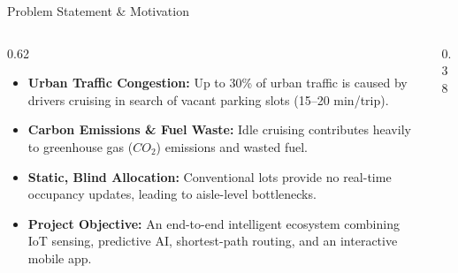 \documentclass[aspectratio=169]{beamer}
\begin{document}
\begin{frame}{Problem Statement \& Motivation}
    \begin{columns}
        \begin{column}{0.62\textwidth}
            \begin{itemize}
                \item \textbf{Urban Traffic Congestion:} Up to 30\% of urban traffic is caused by drivers cruising in search of vacant parking slots (15--20 min/trip).
                \item \textbf{Carbon Emissions \& Fuel Waste:} Idle cruising contributes heavily to greenhouse gas ($CO_2$) emissions and wasted fuel.
                \item \textbf{Static, Blind Allocation:} Conventional lots provide no real-time occupancy updates, leading to aisle-level bottlenecks.
                \item \textbf{Project Objective:} An end-to-end intelligent ecosystem combining IoT sensing, predictive AI, shortest-path routing, and an interactive mobile app.
            \end{itemize}
        \end{column}
        \begin{column}{0.38\textwidth}
            \begin{center}
            \end{center}
        \end{column}
    \end{columns}
\end{frame}
\end{document}
